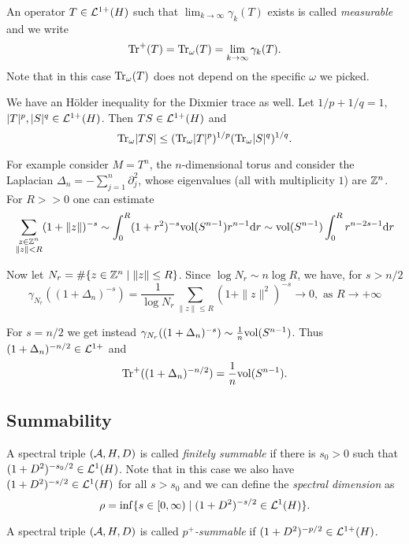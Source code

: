 \begin{definition}
 An operator $T\in\mathcal{L}^{1+}(H)$ such that $\lim_{k\to\infty}\gamma_k(T)$ exists is called \emph{measurable} and we write 
 $$\mathrm{Tr}^+(T)=\mathrm{Tr}_\omega(T)=\lim_{k\to\infty}\gamma_k(T).$$
 Note that in this case $\mathrm{Tr}_\omega(T)$ does not depend on the specific $\omega$ we picked.
\end{definition}

\begin{proposition}
 We have an Hölder inequality for the Dixmier trace as well. Let $1/p+1/q=1$, $|T|^p,|S|^q\in\mathcal{L}^{1+}(H)$. Then $TS\in\mathcal{L}^{1+}(H)$ and $$\mathrm{Tr}_\omega|TS|\leq(\mathrm{Tr}_\omega|T|^p)^{1/p}(\mathrm{Tr}_\omega|S|^q)^{1/q}.$$
\end{proposition}

\begin{example}
 For example consider $M=T^n$, the $n$-dimensional torus and consider the Laplacian $\Delta_n=-\sum_{j=1}^n\partial^2_j$, whose eigenvalues (all with multiplicity $1$) are $\mathbb{Z}^n$. For $R>>0$ one can estimate 
 $$\sum_{\substack{z\in\mathbb{Z}^n\\ \|z\|<R}}(1+\|z\|)^{-s}\sim\int_0^R(1+r^2)^{-s}\mathrm{vol}(S^{n-1})r^{n-1}\mathrm{d}r\sim\mathrm{vol}(S^{n-1})\int_0^Rr^{n-2s-1}\mathrm{d}r$$
 
 \noindent Now let $N_r=\#\{z\in\mathbb{Z}^n\mid \|z\|\leq R\}$. Since $\log N_r\sim n\log R$, we have, for $s>n/2$
 $$\gamma_{N_r}((1+\Delta_n)^{-s})=\frac1{\log N_r}\sum_{\|z\|\leq R}(1+\|z\|^2)^{-s}\to 0,\text{ as }R\to+\infty$$
 
 \noindent For $s=n/2$ we get instead $\gamma_{N_r}((1+\Delta_n)^{-s})\sim\frac1n\mathrm{vol}(S^{n-1})$. Thus $(1+\Delta_n)^{-n/2}\in\mathcal{L}^{1+}$ and $$\mathrm{Tr}^+((1+\Delta_n)^{-n/2})=\frac1n\mathrm{vol}(S^{n-1}).$$
\end{example}

\subsection{Summability}
\begin{definition}
 A spectral triple $(\mathcal{A},H,D)$ is called \emph{finitely summable} if there is $s_0>0$ such that $(1+D^2)^{-s_0/2}\in\mathcal{L}^1(H)$. Note that in this case we also have $(1+D^2)^{-s/2}\in\mathcal{L}^1(H)$ for all $s>s_0$ and we can define the \emph{spectral dimension} as 
 $$\rho=\inf\{s\in[0,\infty)\mid (1+D^2)^{-s/2}\in\mathcal{L}^1(H)\}.$$
\end{definition}

\begin{definition}
 A spectral triple $(\mathcal{A},H,D)$ is called \emph{$p^+$-summable} if $(1+D^2)^{-p/2}\in\mathcal{L}^{1+}(H)$.
\end{definition}

